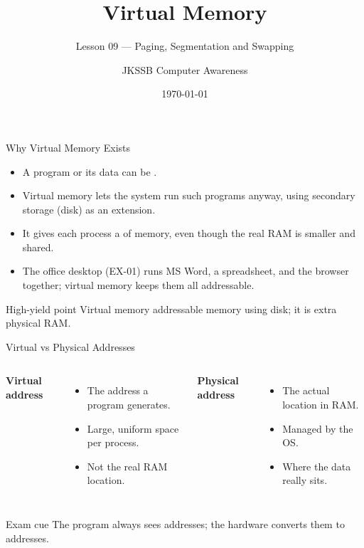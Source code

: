 \documentclass[aspectratio=169]{beamer}
\title{Virtual Memory}
\subtitle{Lesson 09 --- Paging, Segmentation and Swapping}
\author{JKSSB Computer Awareness}
\date{\today}
\begin{document}
\frame{\titlepage}

\begin{frame}{Why Virtual Memory Exists}
  \begin{itemize}
    \item A program or its data can be .
    \item Virtual memory lets the system run such programs anyway, using
      secondary storage (disk) as an extension.
    \item It gives each process a  of memory,
      even though the real RAM is smaller and shared.
    \item The office desktop (EX-01) runs MS Word, a spreadsheet, and the
      browser together; virtual memory keeps them all addressable.
  \end{itemize}
  \begin{block}{High-yield point}
    Virtual memory  addressable memory using disk; it is
     extra physical RAM.
  \end{block}
\end{frame}

\begin{frame}{Virtual vs Physical Addresses}
  \begin{columns}[T]
      \textbf{Virtual address}
      \begin{itemize}
        \item The address a program generates.
        \item Large, uniform space per process.
        \item Not the real RAM location.
      \end{itemize}
      \textbf{Physical address}
      \begin{itemize}
        \item The actual location in RAM.
        \item Managed by the OS.
        \item Where the data really sits.
      \end{itemize}
  \end{columns}
  \vspace{0.2cm}
  \begin{block}{Exam cue}
    The program always sees  addresses; the hardware converts
    them to  addresses.
  \end{block}
\end{frame}
\end{document}
